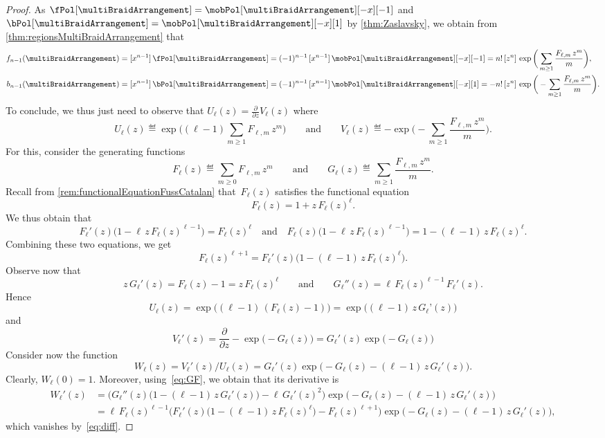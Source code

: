 \begin{proof}
As $\fPol[{\multiBraidArrangement}] = \mobPol[{\multiBraidArrangement}][-x][-1]$ and $\bPol[{\multiBraidArrangement}] = \mobPol[{\multiBraidArrangement}][-x][1]$ by \cref{thm:Zaslavsky}, we obtain from \cref{thm:regionsMultiBraidArrangement} that
\begin{align*}
f_{n-1}(\multiBraidArrangement) & = [x^{n-1}] \, \fPol[{\multiBraidArrangement}] = (-1)^{n-1} \, [x^{n-1}] \, \mobPol[{\multiBraidArrangement}][-x][-1] = n! \, [z^n]  \, \exp \bigg( \sum_{m \ge 1} \frac{F_{\ell,m} \, z^m}{m} \bigg), \\
b_{n-1}(\multiBraidArrangement) & = [x^{n-1}] \, \bPol[{\multiBraidArrangement}] = (-1)^{n-1} \, [x^{n-1}] \, \mobPol[{\multiBraidArrangement}][-x][1] = - n! \, [z^n]  \, \exp \bigg( - \sum_{m \ge 1} \frac{F_{\ell,m} \, z^m}{m} \bigg).
\end{align*}
To conclude, we thus just need to observe that
\(
U_\ell(z) = \frac{\partial}{\partial z} V_\ell(z)
\)
where
\[
U_\ell(z) \eqdef \exp \bigg( (\ell-1) \sum_{m \ge 1} F_{\ell,m} \, z^m \bigg)
\qquad\text{and}\qquad
V_\ell(z) \eqdef - \exp \bigg( - \sum_{m \ge 1} \frac{F_{\ell,m} \, z^m}{m} \bigg).
\]
For this, consider the generating functions
\[
F_\ell(z) \eqdef \sum_{m \ge 0} F_{\ell,m} \, z^m
\qquad\text{and}\qquad
G_\ell(z) \eqdef \sum_{m \ge 1} \frac{F_{\ell,m} \, z^m}{m}.
\]
Recall from \cref{rem:functionalEquationFussCatalan} that~$F_\ell(z)$ satisfies the functional equation
\[
F_\ell(z) = 1 + z \, F_\ell(z)^\ell.
\]
We thus obtain that
\[
F_\ell'(z) \big( 1 - \ell \, z \, F_\ell(z)^{\ell-1} \big) = F_\ell(z)^\ell
\quad\text{and}\quad
F_\ell(z) \big( 1 - \ell \, z \, F_\ell(z)^{\ell-1} \big) = 1 - (\ell-1) \, z \, F_\ell(z)^\ell.
\]
Combining these two equations, we get
\begin{equation}
\label{eq:diff}
F_\ell(z)^{\ell+1} = F_\ell'(z) \big( 1 - (\ell-1) \, z \, F_\ell(z)^\ell \big).
\end{equation}
Observe now that
\begin{equation}
\label{eq:GF}
z \, G_\ell'(z) = F_\ell(z) - 1 = z \, F_\ell(z)^\ell
\qquad\text{and}\qquad
G_\ell''(z) = \ell \, F_\ell(z)^{\ell-1} \, F_\ell'(z).
\end{equation}
Hence
\[
U_\ell(z) = \exp \big( (\ell-1) \, (F_\ell(z) - 1) \big) = \exp \big( (\ell-1) \, z \, G_\ell’(z) \big)
\]
and
\[
V_\ell'(z) = \frac{\partial}{\partial z}  - \exp \big( \! - G_\ell(z) \big) = G_\ell'(z) \exp \big( -G_\ell(z) \big)
\]
Consider now the function
\[
W_\ell(z) = V_\ell'(z) / U_\ell(z) = G_\ell'(z) \exp \big( \! - G_\ell(z) - (\ell-1) \, z \, G_\ell'(z) \big).
\]
Clearly, $W_\ell(0) = 1$.
Moreover, using~\eqref{eq:GF}, we obtain that its derivative is
\begin{align*}
W_\ell'(z)
& = \Big( G_\ell''(z) \big(1 - (\ell-1) \, z \, G_\ell'(z) \big) - \ell \, G_\ell'(z)^2 \Big) \exp \big( \! - G_\ell(z) - (\ell-1) \, z \, G_\ell'(z) \big) \\
& = \ell \, F_\ell(z)^{\ell-1} \Big( F_\ell'(z) \big( 1 - (\ell-1) \, z \, F_\ell(z)^\ell \big) - F_\ell(z)^{\ell+1} \Big) \exp \big( \! - G_\ell(z) - (\ell-1) \, z \, G_\ell'(z) \big),
\end{align*}
which vanishes by~\eqref{eq:diff}.


\end{proof}
